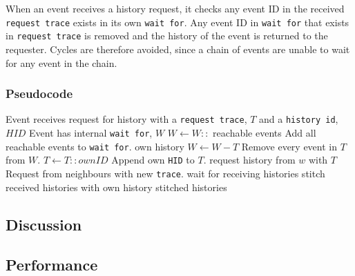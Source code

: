 When an event receives a history request, it checks any event ID in the received \texttt{request trace} exists in its own \texttt{wait for}. Any event ID in \texttt{wait for} that exists in \texttt{request trace} is removed and the history of the event is returned to the requester. 
Cycles are therefore avoided, since a chain of events are unable to wait for any event in the chain. \bigskip 


\subsubsection*{Pseudocode}
\begin{algorithmic}
	\State Event receives request for history with a \texttt{request trace}, $T$ and a \texttt{history id}, $HID$
	\State Event has internal \texttt{wait for}, $W$
	\State
	\State $W\gets W::$ reachable events \Comment Add all reachable events to \texttt{wait for}.
	\Return own history
	\Else
	\State $W\gets W-T$ \Comment Remove every event in $T$ from $W$.
	\State $T\gets T::ownID$ \Comment Append own \texttt{HID} to $T$.
	\State
	\State request history from $w$ with $T$ \Comment Request from neighbours with new \texttt{trace}.
	\EndFor
	\State wait for receiving histories
	\State stitch received histories with own history
	\State
	\Return stitched histories
	\EndIf
\end{algorithmic}

\subsection{Discussion} %
\subsection{Performance} %